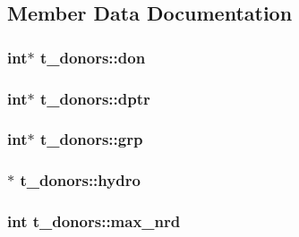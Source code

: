 \subsection{\-Member \-Data \-Documentation}
\hypertarget{structt__donors_a8a51d30f3f3c35b222ddc19981817ab3}{
\subsubsection[{don}]{\setlength{\rightskip}{0pt plus 5cm}int$\ast$ {\bf t\-\_\-donors\-::don}}}\label{structt__donors_a8a51d30f3f3c35b222ddc19981817ab3}
\hypertarget{structt__donors_ae339a5ed5241d34fb7956e8efd202309}{
\subsubsection[{dptr}]{\setlength{\rightskip}{0pt plus 5cm}int$\ast$ {\bf t\-\_\-donors\-::dptr}}}\label{structt__donors_ae339a5ed5241d34fb7956e8efd202309}
\hypertarget{structt__donors_a86f60dc0777a8af09de284a54050f962}{
\subsubsection[{grp}]{\setlength{\rightskip}{0pt plus 5cm}int$\ast$ {\bf t\-\_\-donors\-::grp}}}\label{structt__donors_a86f60dc0777a8af09de284a54050f962}
\hypertarget{structt__donors_a1b1249da150787838c412cd594c032ba}{
\subsubsection[{hydro}]{$\ast$ {\bf t\-\_\-donors\-::hydro}}}\label{structt__donors_a1b1249da150787838c412cd594c032ba}
\hypertarget{structt__donors_a14328c400108abcc955e258c0be6e70f}{
\subsubsection[{max\-\_\-nrd}]{\setlength{\rightskip}{0pt plus 5cm}int {\bf t\-\_\-donors\-::max\-\_\-nrd}}}\label{structt__donors_a14328c400108abcc955e258c0be6e70f}
